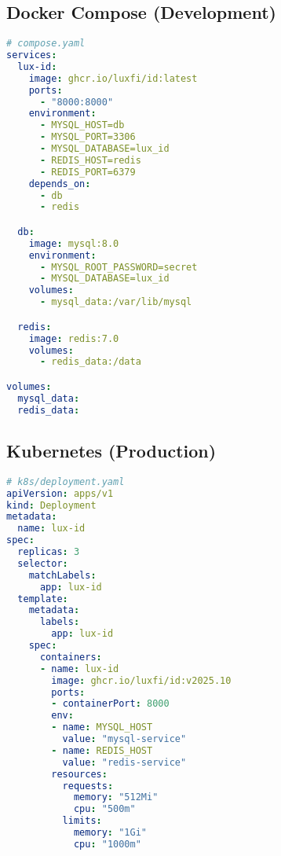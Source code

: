 \documentclass[11pt,a4paper]{article}
\begin{document}
\subsection{Docker Compose (Development)}

\begin{lstlisting}[language=yaml]
# compose.yaml
services:
  lux-id:
    image: ghcr.io/luxfi/id:latest
    ports:
      - "8000:8000"
    environment:
      - MYSQL_HOST=db
      - MYSQL_PORT=3306
      - MYSQL_DATABASE=lux_id
      - REDIS_HOST=redis
      - REDIS_PORT=6379
    depends_on:
      - db
      - redis

  db:
    image: mysql:8.0
    environment:
      - MYSQL_ROOT_PASSWORD=secret
      - MYSQL_DATABASE=lux_id
    volumes:
      - mysql_data:/var/lib/mysql

  redis:
    image: redis:7.0
    volumes:
      - redis_data:/data

volumes:
  mysql_data:
  redis_data:
\end{lstlisting}

\subsection{Kubernetes (Production)}

\begin{lstlisting}[language=yaml]
# k8s/deployment.yaml
apiVersion: apps/v1
kind: Deployment
metadata:
  name: lux-id
spec:
  replicas: 3
  selector:
    matchLabels:
      app: lux-id
  template:
    metadata:
      labels:
        app: lux-id
    spec:
      containers:
      - name: lux-id
        image: ghcr.io/luxfi/id:v2025.10
        ports:
        - containerPort: 8000
        env:
        - name: MYSQL_HOST
          value: "mysql-service"
        - name: REDIS_HOST
          value: "redis-service"
        resources:
          requests:
            memory: "512Mi"
            cpu: "500m"
          limits:
            memory: "1Gi"
            cpu: "1000m"
\end{lstlisting}
\end{document}
